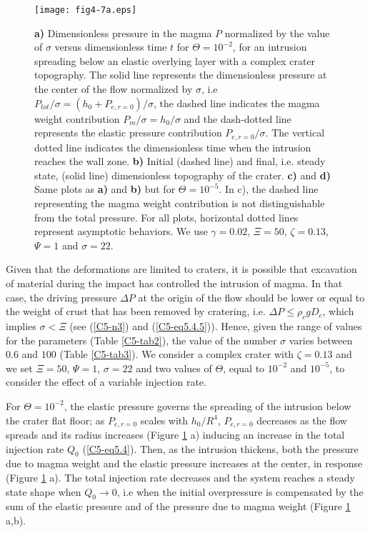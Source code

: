 \begin{figure}[h!]
  \graphicspath{ {/Users/thorey/Documents/These/Submission/Article/FFC_JGR_2013/Paper_APRES_2nd_REVIEW/} }
  \centering
  \noindent\texttt{[image: fig4-7a.eps]}
  \caption{\textbf{a)}  Dimensionless   pressure  in  the   magma  $P$
    normalized by the value of  $\sigma$ versus dimensionless time $t$
    for $\Theta=10^{-2}$, for an  intrusion spreading below an elastic
    overlying layer with a complex  crater topography.  The solid line
    represents the  dimensionless pressure at  the center of  the flow
    normalized              by              $\sigma$,              i.e
    $P_{tot}/\sigma=(h_0+P_{e,r=0})/\sigma$, the dashed line indicates
    the  magma  weight  contribution $P_m/\sigma=h_0/\sigma$  and  the
    dash-dotted  line  represents  the elastic  pressure  contribution
    $P_{e,r=0}/\sigma$.   The  vertical   dotted  line  indicates  the
    dimensionless  time  when the  intrusion  reaches  the wall  zone.
    \textbf{b)} Initial  (dashed line) and final,  i.e.  steady state,
    (solid line)  dimensionless topography of the  crater. \textbf{c)}
    and \textbf{d)} Same plots as  \textbf{a)} and \textbf{b)} but for
    $\Theta=10^{-5}$.  In  c), the dashed line  representing the magma
    weight  contribution   is  not  distinguishable  from   the  total
    pressure.   For  all  plots,  horizontal  dotted  lines  represent
    asymptotic   behaviors.     We   use    $\gamma=0.02$,   $\Xi=50$,
    $\zeta=0.13$, $\Psi=1$ and $\sigma=22$.}
  \label{C5-fig4-7}
\end{figure}
 
Given that  the deformations  are limited to  craters, it  is possible
that  excavation of  material  during the  impact  has controlled  the
intrusion of magma.  In that case,  the driving pressure $\Delta P$ at
the origin of the flow should be lower or equal to the weight of crust
that has been  removed by cratering, i.e.  $\Delta  P\le \rho_c gD_c$,
which implies $\sigma<\Xi$ (see (\ref{C5-n3}) and (\ref{C5-eq5.4.5})).
Hence,  given   the  range  of   values  for  the   parameters  (Table
\ref{C5-tab2}), the value of the  number $\sigma$ varies between $0.6$
and $100$  (Table \ref{C5-tab3}).  We  consider a complex  crater with
$\zeta=0.13$ and we set $\Xi=50$, $\Psi=1$, $\sigma=22$ and two values
of $\Theta$, equal to $10^{-2}$  and $10^{-5}$, to consider the effect
of a variable injection rate.

For $\Theta=10^{-2}$,  the elastic  pressure governs the  spreading of
the intrusion below the crater  flat floor; as $P_{e,r=0}$ scales with
$h_0/R^4$, $P_{e,r=0}$  decreases as the  flow spreads and  its radius
increases (Figure \ref{C5-fig4-7} a) inducing an increase in the total
injection  rate  $Q_{0}$  (\ref{C5-eq5.4}).  Then,  as  the  intrusion
thickens,  both the  pressure  due  to magma  weight  and the  elastic
pressure increases at the  center, in response (Figure \ref{C5-fig4-7}
a). The total injection rate decreases and the system reaches a steady
state   shape  when   $Q_{0}\rightarrow0$,   i.e   when  the   initial
overpressure is compensated by the sum  of the elastic pressure and of
the pressure due to magma weight (Figure \ref{C5-fig4-7} a,b).

